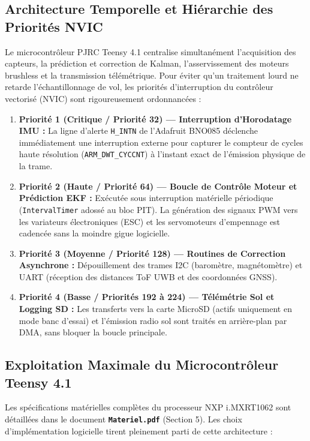 \documentclass[../Implementation.tex]{subfiles}
\begin{document}
\subsection{Architecture Temporelle et Hiérarchie des Priorités NVIC}

Le microcontrôleur PJRC Teensy 4.1 centralise simultanément l'acquisition des capteurs, la prédiction et correction de Kalman, l'asservissement des moteurs brushless et la transmission télémétrique. Pour éviter qu'un traitement lourd ne retarde l'échantillonnage de vol, les priorités d'interruption du contrôleur vectorisé (NVIC) sont rigoureusement ordonnancées :

\begin{enumerate}
    \item \textbf{Priorité 1 (Critique / Priorité 32) — Interruption d'Horodatage IMU :}
    La ligne d'alerte \lstinline|H_INTN| de l'Adafruit BNO085 déclenche immédiatement une interruption externe pour capturer le compteur de cycles haute résolution (\lstinline|ARM_DWT_CYCCNT|) à l'instant exact de l'émission physique de la trame.
    
    \item \textbf{Priorité 2 (Haute / Priorité 64) — Boucle de Contrôle Moteur et Prédiction EKF :}
    Exécutée sous interruption matérielle périodique (\lstinline|IntervalTimer| adossé au bloc PIT). La génération des signaux PWM vers les variateurs électroniques (ESC) et les servomoteurs d'empennage est cadencée sans la moindre gigue logicielle.
    
    \item \textbf{Priorité 3 (Moyenne / Priorité 128) — Routines de Correction Asynchrone :}
    Dépouillement des trames I2C (baromètre, magnétomètre) et UART (réception des distances ToF UWB et des coordonnées GNSS).
    
    \item \textbf{Priorité 4 (Basse / Priorités 192 à 224) — Télémétrie Sol et Logging SD :}
    Les transferts vers la carte MicroSD (actifs uniquement en mode banc d'essai) et l'émission radio sol sont traités en arrière-plan par DMA, sans bloquer la boucle principale.
\end{enumerate}

\subsection{Exploitation Maximale du Microcontrôleur Teensy 4.1}

Les spécifications matérielles complètes du processeur NXP i.MXRT1062 sont détaillées dans le document \textbf{\texttt{Materiel.pdf}} (Section 5). Les choix d'implémentation logicielle tirent pleinement parti de cette architecture :
\end{document}
